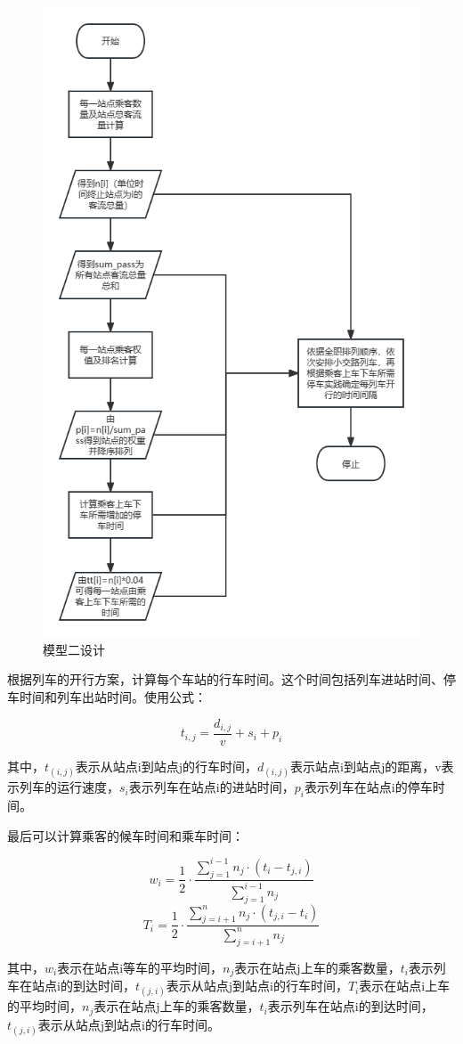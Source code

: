 \documentclass[UTF8]{ctexart}
\begin{document}
\begin{figure}[h]
	\centering
	\includegraphics[scale=0.4]{模型二设计.png}
	\caption{模型二设计}
\end{figure}\par
根据列车的开行方案，计算每个车站的行车时间。这个时间包括列车进站时间、停车时间和列车出站时间。使用公式：\par
$$
t_{i,j}=\frac{d_{i,j}}{v}+s_i+p_i
$$\par
其中，$t_(i,j)$表示从站点i到站点j的行车时间，$d_(i,j)$表示站点i到站点j的距离，v表示列车的运行速度，$s_i$表示列车在站点i的进站时间，$p_i$表示列车在站点i的停车时间。\par
最后可以计算乘客的候车时间和乘车时间：\par
$$
w_i=\frac{1}{2}\cdot \frac{\sum_{j=1}^{i-1}{n_j}\cdot (t_i-t_{j,i})}{\sum_{j=1}^{i-1}{n_j}}
$$
$$
T_i=\frac{1}{2}\cdot \frac{\sum_{j=i+1}^n{n_j}\cdot (t_{j,i}-t_i)}{\sum_{j=i+1}^n{n_j}}
$$\par
其中，$w_i$表示在站点i等车的平均时间，$n_j$表示在站点j上车的乘客数量，$t_i$表示列车在站点i的到达时间，$t_(j,i)$表示从站点j到站点i的行车时间，$T_i$表示在站点i上车的平均时间，$n_j$表示在站点j上车的乘客数量，$t_i$表示列车在站点i的到达时间，$t_(j,i)$表示从站点j到站点i的行车时间。
\end{document}
